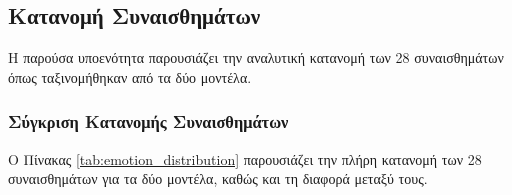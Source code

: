 \documentclass[a4paper,11pt,oneside,openany]{ioniothesis}
\begin{document}
\subsection{Κατανομή Συναισθημάτων}
\label{sec:Κατανομή Συναισθημάτων}

Η παρούσα υποενότητα παρουσιάζει την αναλυτική κατανομή των 28 συναισθημάτων όπως ταξινομήθηκαν από τα δύο μοντέλα.

\subsubsection{Σύγκριση Κατανομής Συναισθημάτων}
\label{sec:Σύγκριση Κατανομής Συναισθημάτων}

Ο Πίνακας \ref{tab:emotion_distribution} παρουσιάζει την πλήρη κατανομή των 28 συναισθημάτων για τα δύο μοντέλα, καθώς και τη διαφορά μεταξύ τους.
\end{document}
